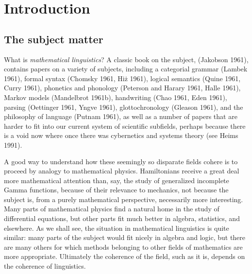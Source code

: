 \chapter{Introduction}

\section{The subject matter}

What is {\it mathematical linguistics}? A classic book on the subject,
(Jakobson 1961),\nocite{Jakobson:1961} contains papers on a variety of
subjects, including a categorial grammar (Lambek 1961), formal syntax (Chomsky
1961, Hi\.{z} 1961), logical semantics (Quine 1961, Curry 1961), phonetics and
phonology (Peterson and Harary 1961, Halle 1961), Markov models (Mandelbrot
1961b), handwriting (Chao 1961, Eden 1961), parsing (Oettinger 1961, Yngve
1961), glottochronology (Gleason 1961), and the philosophy of language (Putnam
1961), as well as a number of papers that are harder to fit into our current
system of scientific subfields, perhaps because there is a void now where once
there was cybernetics and systems theory (see Heims 1991).
\nocite{Lambek:1961}\nocite{Chomsky:1961}\nocite{Hiz:1961}
\nocite{Quine:1961}\nocite{Curry:1961}\nocite{Peterson:1961}
\nocite{Halle:1961}\nocite{Mandelbrot:1961}\nocite{Chao:1961}
\nocite{Eden:1961}\nocite{Oettinger:1961}\nocite{Yngve:1961}
\nocite{Gleason:1961}\nocite{Putnam:1961}\nocite{Heims:1991}

A good way to understand how these seemingly so disparate fields cohere is to
proceed by analogy to mathematical physics. Hamiltonians receive a great deal
more mathematical attention than, say, the study of generalized incomplete
Gamma functions, because of their relevance to mechanics, not because the
subject is, from a purely mathematical perspective, necessarily more
interesting. Many parts of mathematical physics find a natural home in the
study of differential equations, but other parts fit much better in algebra,
statistics, and elsewhere. As we shall see, the situation in mathematical
linguistics is quite similar: many parts of the subject would fit nicely in
algebra and logic, but there are many others for which methods belonging to
other fields of mathematics are more appropriate. Ultimately the coherence of
the field, such as it is, depends on the coherence of linguistics.

